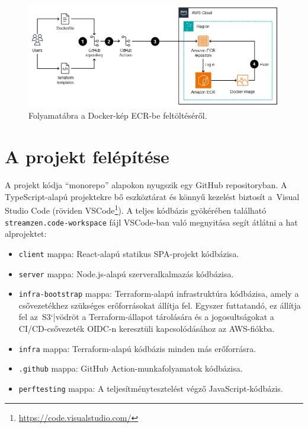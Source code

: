\begin{figure}[h]
	\centering
	\includegraphics[width=150mm, keepaspectratio]{figures/ecr.png}
	\caption{Folyamatábra a Docker-kép ECR-be feltöltéséről.}
	\label{fig:ecr}
\end{figure}

\section{A projekt felépítése}

A projekt kódja ``monorepo'' alapokon nyugszik egy GitHub repositoryban. A TypeScript-alapú projektekre bő eszköztárat és könnyű kezelést biztosít a~Visual Studio Code (röviden VSCode\footnote{\url{https://code.visualstudio.com/}}). A teljes kódbázis gyökérében található \verb|streamzen.code-workspace| fájl VSCode-ban való megnyitása segít átlátni a hat alprojektet:

\begin{itemize}
	\setlength{\itemsep}{1pt}
  \setlength{\parskip}{0pt}
  \setlength{\parsep}{0pt}
	\item \verb|client| mappa: React-alapú statikus SPA-projekt kódbázisa.
	\item \verb|server| mappa: Node.js-alapú szerveralkalmazás kódbázisa.
	\item \verb|infra-bootstrap| mappa: Terraform-alapú infrastruktúra kódbázisa, amely a csővezetékhez szükséges erőforrásokat állítja fel. Egyszer futtatandó, ez állítja fel az~S3`|vödröt a Terraform-állapot tárolására és a jogosultságokat a CI/CD-csővezeték OIDC-n keresztüli kapcsolódásához az AWS-fiókba.
	\item \verb|infra| mappa: Terraform-alapú kódbázis minden más erőforrásra.
	\item \verb|.github| mappa: GitHub Action-munkafolyamatok kódbázisa.
	\item \verb|perftesting| mappa: A teljesítménytesztelést végző JavaScript-kódbázis.
\end{itemize}
